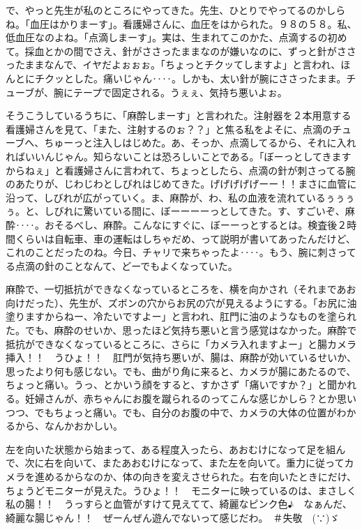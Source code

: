 で、やっと先生が私のところにやってきた。先生、ひとりでやってるのかしらね。「血圧はかりまーす」。看護婦さんに、血圧をはかられた。９８の５８。私、低血圧なのよね。「点滴しまーす」。実は、生まれてこのかた、点滴するの初めて。採血とかの間でさえ、針がささったままなのが嫌いなのに、ずっと針がささったままなんで、イヤだよぉぉぉ。「ちょっとチクッてしますよ」と言われ、ほんとにチクッとした。痛いじゃん‥‥。しかも、太い針が腕にささったまま。チューブが、腕にテープで固定される。うぇぇ、気持ち悪いよぉ。

そうこうしているうちに、「麻酔しまーす」と言われた。注射器を２本用意する看護婦さんを見て、「また、注射するのぉ？？」と焦る私をよそに、点滴のチューブへ、ちゅーっと注入しはじめた。あ、そっか、点滴してるから、それに入れればいいんじゃん。知らないことは恐ろしいことである。「ぼーっとしてきますからねぇ」と看護婦さんに言われて、ちょっとしたら、点滴の針が刺さってる腕のあたりが、じわじわとしびれはじめてきた。げげげげげーー！！まさに血管に沿って、しびれが広がっていく。ま、麻酔が、わ、私の血液を流れているぅぅぅぅ。と、しびれに驚いている間に、ぼーーーーっとしてきた。す、すごいぞ、麻酔‥‥。おそるべし、麻酔。こんなにすぐに、ぼーーっとするとは。検査後２時間くらいは自転車、車の運転はしちゃだめ、って説明が書いてあったんだけど、これのことだったのね。今日、チャリで来ちゃったよ‥‥。もう、腕に刺さってる点滴の針のことなんて、どーでもよくなっていた。

麻酔で、一切抵抗ができなくなっているところを、横を向かされ（それまであお向けだった）、先生が、ズボンの穴からお尻の穴が見えるようにする。「お尻に油塗りますからねー、冷たいですよー」と言われ、肛門に油のようなものを塗られた。でも、麻酔のせいか、思ったほど気持ち悪いと言う感覚はなかった。麻酔で抵抗ができなくなっているところに、さらに「カメラ入れますよー」と腸カメラ挿入！！　うひょ！！　肛門が気持ち悪いが、腸は、麻酔が効いているせいか、思ったより何も感じない。でも、曲がり角に来ると、カメラが腸にあたるので、ちょっと痛い。うっ、とかいう顔をすると、すかさず「痛いですか？」と聞かれる。妊婦さんが、赤ちゃんにお腹を蹴られるのってこんな感じかしら？とか思いつつ、でもちょっと痛い。でも、自分のお腹の中で、カメラの大体の位置がわかるから、なんかおかしい。

左を向いた状態から始まって、ある程度入ったら、あおむけになって足を組んで、次に右を向いて、またあおむけになって、また左を向いて。重力に従ってカメラを進めるからなのか、体の向きを変えさせられた。右を向いたときにだけ、ちょうどモニターが見えた。うひょ！！　モニターに映っているのは、まさしく私の腸！！　うっすらと血管がすけて見えてて、綺麗なピンク色♪　なぁんだ、綺麗な腸じゃん！！　ぜーんぜん遊んでないって感じだわ。　＃失敬　(∵)ゞ

